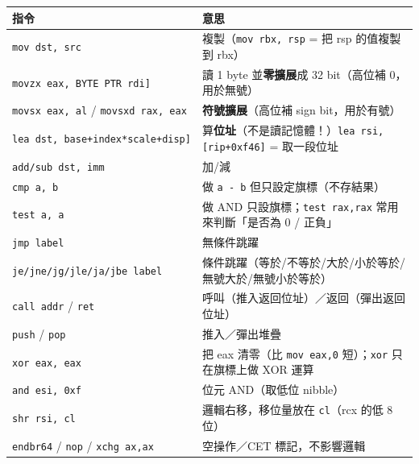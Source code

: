 \documentclass[10pt,a4paper]{article}
\newcounter{none}
\begin{document}
{\def\LTcaptype{none} %
\begin{longtable}[]{@{}
  >{\raggedright\arraybackslash}p{}
  >{\raggedright\arraybackslash}p{}@{}}
\toprule\noalign{}
\begin{minipage}[b]{\linewidth}\raggedright
指令
\end{minipage} & \begin{minipage}[b]{\linewidth}\raggedright
意思
\end{minipage} \\
\midrule\noalign{}
\endhead
\bottomrule\noalign{}
\endlastfoot
\texttt{mov\ \allowbreak{}dst,\allowbreak{}\ \allowbreak{}src} & 複製（\texttt{mov\ \allowbreak{}rbx,\allowbreak{}\ \allowbreak{}rsp} = 把 rsp
的值複製到 rbx） \\
\texttt{movzx\ \allowbreak{}eax,\allowbreak{}\ \allowbreak{}BYTE\ \allowbreak{}PTR\ \allowbreak{}{[}rdi{]}} & 讀 1 byte
並\textbf{零擴展}成 32 bit（高位補 0，用於無號） \\
\texttt{movsx\ \allowbreak{}eax,\allowbreak{}\ \allowbreak{}al} / \texttt{movsxd\ \allowbreak{}rax,\allowbreak{}\ \allowbreak{}eax} &
\textbf{符號擴展}（高位補 sign bit，用於有號） \\
\texttt{lea\ \allowbreak{}dst,\allowbreak{}\ \allowbreak{}{[}base+index*scale+disp{]}} &
算\textbf{位址}（不是讀記憶體！）\texttt{lea\ \allowbreak{}rsi,{[}rip+0xf46{]}} =
取一段位址 \\
\texttt{add/\allowbreak{}sub\ \allowbreak{}dst,\allowbreak{}\ \allowbreak{}imm} & 加/減 \\
\texttt{cmp\ \allowbreak{}a,\allowbreak{}\ \allowbreak{}b} & 做 \texttt{a\ \allowbreak{}-\allowbreak{}\ \allowbreak{}b} 但只設定旗標（不存結果） \\
\texttt{test\ \allowbreak{}a,\allowbreak{}\ \allowbreak{}a} & 做 AND 只設旗標；\texttt{test\ \allowbreak{}rax,\allowbreak{}rax}
常用來判斷「是否為 0 / 正負」 \\
\texttt{jmp\ \allowbreak{}label} & 無條件跳躍 \\
\texttt{je/\allowbreak{}jne/\allowbreak{}jg/\allowbreak{}jle/\allowbreak{}ja/\allowbreak{}jbe\ \allowbreak{}label} &
條件跳躍（等於/不等於/大於/小於等於/無號大於/無號小於等於） \\
\texttt{call\ \allowbreak{}addr} / \texttt{ret} &
呼叫（推入返回位址）／返回（彈出返回位址） \\
\texttt{push} / \texttt{pop} & 推入／彈出堆疊 \\
\texttt{xor\ \allowbreak{}eax,\allowbreak{}\ \allowbreak{}eax} & 把 eax 清零（比 \texttt{mov\ \allowbreak{}eax,\allowbreak{}0}
短）；\texttt{xor} 只在旗標上做 XOR 運算 \\
\texttt{and\ \allowbreak{}esi,\allowbreak{}\ \allowbreak{}0xf} & 位元 AND（取低位 nibble） \\
\texttt{shr\ \allowbreak{}rsi,\allowbreak{}\ \allowbreak{}cl} & 邏輯右移，移位量放在 \texttt{cl}（rcx 的低 8
位） \\
\texttt{endbr64} / \texttt{nop} / \texttt{xchg\ \allowbreak{}ax,\allowbreak{}ax} & 空操作／CET
標記，不影響邏輯 \\
\end{longtable}
}
\end{document}
